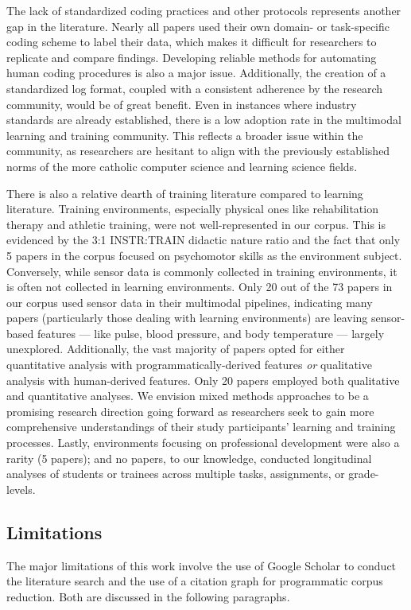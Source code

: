 \documentclass[manuscript,screen,review]{acmart}
\begin{document}
The lack of standardized coding practices and other protocols represents another gap in the literature. Nearly all papers used their own domain- or task-specific coding scheme to label their data, which makes it difficult for researchers to replicate and compare findings. Developing reliable methods for automating human coding procedures is also a major issue. Additionally, the creation of a standardized log format, coupled with a consistent adherence by the research community, would be of great benefit. Even in instances where industry standards are already established, there is a low adoption rate in the multimodal learning and training community. This reflects a broader issue within the community, as researchers are hesitant to align with the previously established norms of the more catholic computer science and learning science fields.  

There is also a relative dearth of training literature compared to learning literature. Training environments, especially physical ones like rehabilitation therapy and athletic training, were not well-represented in our corpus. This is evidenced by the 3:1 INSTR:TRAIN didactic nature ratio and the fact that only 5 papers in the corpus focused on psychomotor skills as the environment subject. Conversely, while sensor data is commonly collected in training environments, it is often not collected in learning environments. Only 20 out of the 73 papers in our corpus used sensor data in their multimodal pipelines, indicating many papers (particularly those dealing with learning environments) are leaving sensor-based features --- like pulse, blood pressure, and body temperature --- largely unexplored. Additionally, the vast majority of papers opted for either quantitative analysis with programmatically-derived features \textit{or} qualitative analysis with human-derived features. Only 20 papers employed both qualitative and quantitative analyses. We envision mixed methods approaches to be a promising research direction going forward as researchers seek to gain more comprehensive understandings of their study participants' learning and training processes. Lastly, environments focusing on professional development were also a rarity (5 papers); and no papers, to our knowledge, conducted longitudinal analyses of students or trainees across multiple tasks, assignments, or grade-levels. 

\subsection{Limitations}
The major limitations of this work involve the use of Google Scholar to conduct the literature search and the use of a citation graph for programmatic corpus reduction. Both are discussed in the following paragraphs.
\end{document}
